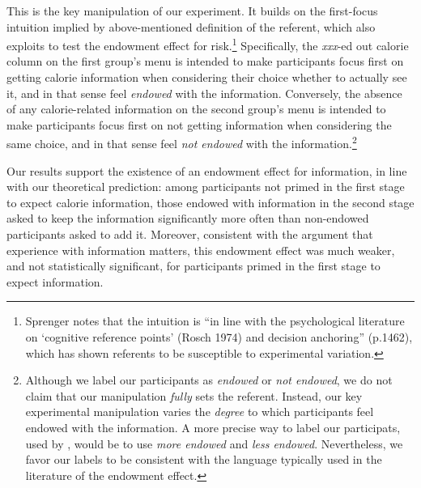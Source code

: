 This is the key manipulation of our experiment. It builds on the first-focus intuition implied by \citet{koszegiModelReferenceDependentPreferences2006} above-mentioned definition of the referent, which \citet{sprengerEndowmentEffectRisk2015} also exploits to test the endowment effect for risk.\footnote{Sprenger notes that the intuition is \enquote{in line with the psychological literature on \enquote{cognitive reference points} (Rosch 1974) and decision anchoring} (p.1462), which has shown referents to be susceptible to experimental variation.} Specifically, the \emph{xxx}-ed out calorie column on the first group's menu is intended to make participants focus first on getting calorie information when considering their choice whether to actually see it, and in that sense feel \emph{endowed} with the information. Conversely, the absence of any calorie-related information on the second group's menu is intended to make participants focus first on not getting information when considering the same choice, and in that sense feel \emph{not endowed} with the information.\footnote{Although we label our participants as \emph{endowed} or \emph{not endowed}, we do not claim that our manipulation \emph{fully} sets the referent. Instead, our key experimental manipulation varies the \emph{degree} to which participants feel endowed with the information. A more precise way to label our participats, used by \citet{heffetzEndowmentEffectExpectations2014}, would be to use \emph{more endowed} and \emph{less endowed}. Nevertheless, we favor our labels to be consistent with the language typically used in the literature of the endowment effect.}

Our results support the existence of an endowment effect for information, in line with our theoretical prediction: among participants not primed in the first stage to expect calorie information, those endowed with information in the second stage asked to keep the information significantly more often than non-endowed participants asked to add it. Moreover, consistent with the argument that experience with information matters, this endowment effect was much weaker, and not statistically significant, for participants primed in the first stage to expect information.

